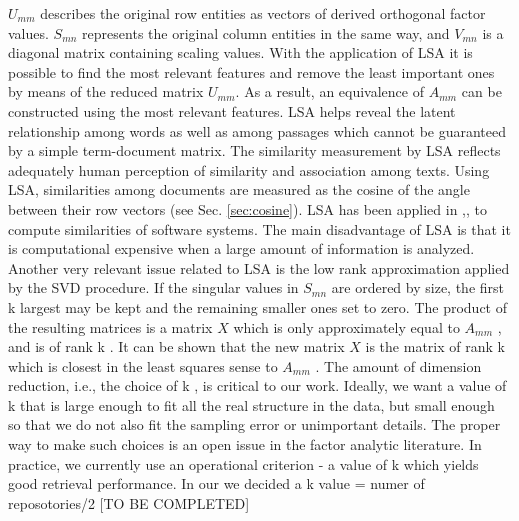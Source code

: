$U_{mm}$ describes the original row entities as vectors of derived orthogonal factor values. $S_{mn}$ represents the original column entities in the same way, and $V_{mn}$ is a diagonal matrix containing scaling values. With the application of LSA it is possible to find the most relevant features and remove the least important ones by means of the reduced matrix $U_{mm}$. As a result, an equivalence of $A_{mm}$ can be constructed using the most relevant features. LSA helps reveal the latent relationship among words as well as among passages which cannot be guaranteed by a simple term-document matrix. The similarity measurement by LSA reflects adequately human perception of similarity and association among texts. Using LSA, similarities among documents are measured as the cosine of the angle between their row vectors (see Sec. \ref{sec:cosine}). LSA has been applied in \cite{10.1109/APSEC.2004.69},\cite{10.1109ICPC.2016.7503721},\cite{McMillan:2012:DSS:2337223.2337267} to compute similarities of software systems. The main disadvantage of LSA is that it is computational expensive when a large amount of information is analyzed.
Another very relevant issue related to LSA is the low rank approximation applied by the SVD procedure. If the singular values in $S_{mn}$ are ordered by size, the first k largest may be kept and the remaining smaller ones set to zero. The product of the resulting matrices is a matrix $X$ which is only approximately equal to $A_{mm}$ , and is of rank k . It can be shown that the new matrix $X$ is the matrix of rank k which is closest in the least squares sense to $A_{mm}$ .
The amount of dimension reduction, i.e., the choice of k , is critical to our work. Ideally, we want a value of k that is large enough to fit all the real structure in the data, but small enough so that we do not also fit the sampling error or unimportant details. The proper way to make such choices is an open issue in the factor analytic literature. In practice, we currently use an operational criterion - a
value of k which yields good retrieval performance. In our we decided a k value = numer of reposotories/2 [TO BE COMPLETED]